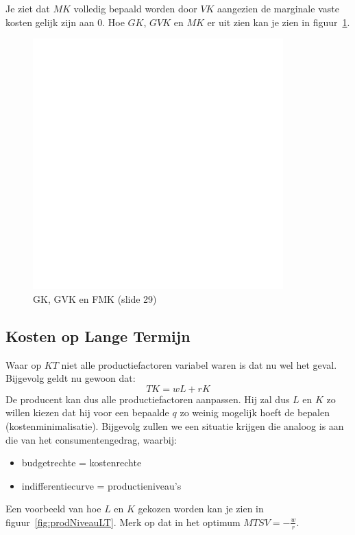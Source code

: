 Je ziet dat $MK$ volledig bepaald worden door $VK$ aangezien de marginale vaste kosten gelijk zijn aan 0. Hoe $GK$, $GVK$ en $MK$ er uit zien
kan je zien in figuur~\ref{fig:GKGVKMK}.
\begin{figure}[htbp]
	\centering
	\includegraphics[scale=0.4]{Images/white.png}
	\caption{GK, GVK en FMK (slide 29)}
	\label{fig:GKGVKMK}
\end{figure}


\subsection{Kosten op Lange Termijn}
Waar op $KT$ niet alle productiefactoren variabel waren is dat nu wel het geval. Bijgevolg geldt nu gewoon dat:
\begin{equation}
	TK = wL + rK
\end{equation}
De producent kan dus alle productiefactoren aanpassen. Hij zal dus $L$ en $K$ zo willen kiezen dat hij voor een bepaalde $q$ zo weinig
mogelijk hoeft de bepalen (kostenminimalisatie). Bijgevolg zullen we een situatie krijgen die analoog is aan die van het consumentengedrag, waarbij:
\begin{itemize}
	\item budgetrechte = kostenrechte
	\item indifferentiecurve = productieniveau's
\end{itemize}
Een voorbeeld van hoe $L$ en $K$ gekozen worden kan je zien in figuur~\ref{fig:prodNiveauLT}. Merk op dat in het optimum $MTSV = -\frac{w}{r}$.

